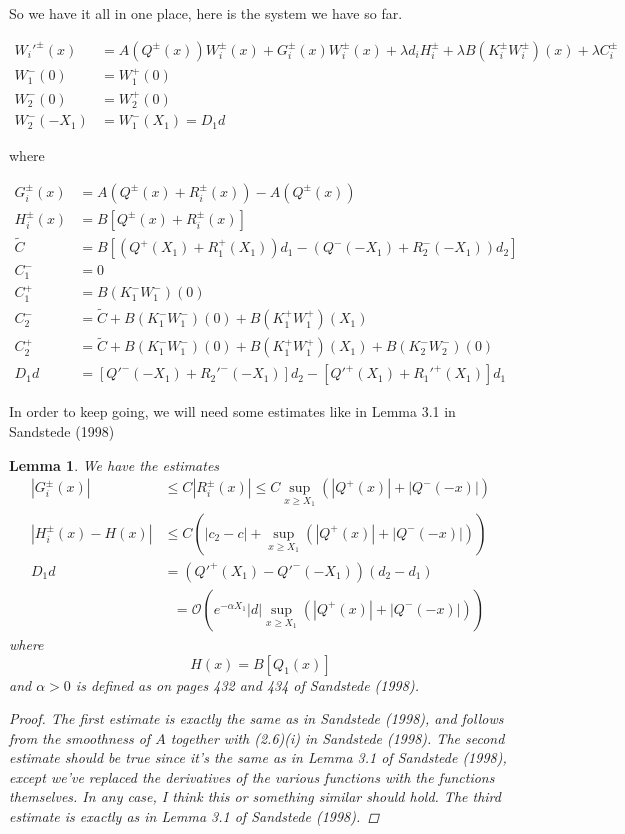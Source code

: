 \documentclass[12pt]{article}
\newtheorem{lemma}{Lemma}
\begin{document}
So we have it all in one place, here is the system we have so far.

\begin{align*}
W_i'^\pm(x) &= A(Q^\pm(x))W_i^\pm(x) + G_i^\pm(x)W_i^\pm(x) + \lambda d_i H_i^\pm + \lambda B (K_i^\pm W_i^\pm)(x) + \lambda C_i^\pm \\
W_1^-(0) &= W_1^+(0) \\
W_2^-(0) &= W_2^+(0) \\
W_2^-(-X_1) &= W_1^-(X_1) = D_1 d
\end{align*}

where

\begin{align*}
G_i^\pm(x) &= A(Q^\pm(x) + R_i^\pm(x)) - A(Q^\pm(x)) \\
H_i^\pm(x) &= B[Q^\pm(x) + R_i^\pm(x)] \\
\tilde{C} &= B[ (Q^+(X_1) + R_1^+(X_1)) d_1 - (Q^-(-X_1) + R_2^-(-X_1)) d_2 ] \\
C_1^- &= 0 \\
C_1^+ &= B(K_1^- W_1^-)(0) \\
C_2^- &= \tilde{C} + B(K_1^- W_1^-)(0) + B(K_1^+ W_1^+)(X_1) \\
C_2^+ &= \tilde{C} + B(K_1^- W_1^-)(0) + B(K_1^+ W_1^+)(X_1) + B(K_2^- W_2^-)(0) \\
D_1 d &= [Q'^-(-X_1) + R_2'^-(-X_1)]d_2 - [Q'^+(X_1) + R_1'^+(X_1)]d_1
\end{align*}

In order to keep going, we will need some estimates like in Lemma 3.1 in Sandstede (1998)

\begin{lemma}We have the estimates
\begin{align*}
|G_i^\pm(x)| &\leq C|R_i^\pm(x)| \leq C \sup_{x \geq X_1} \left( |Q^+(x)| + |Q^-(-x)| \right)\\
|H_i^\pm(x) - H(x)| &\leq C\left(|c_2 - c| + \sup_{x \geq X_1} \left( |Q^+(x)| + |Q^-(-x)| \right) \right)\\
D_1 d &= (Q'^+(X_1) - Q'^-(-X_1))(d_2 - d_1) \\
&\:\:\: =\mathcal{O}\left( e^{-\alpha X_1} |d| \sup_{x \geq X_1} \left( |Q^+(x)| + |Q^-(-x)| \right) \right)
\end{align*}
where
\[
H(x) = B[Q_1(x)]
\]
and $\alpha > 0$ is defined as on pages 432 and 434 of Sandstede (1998).
\begin{proof}
The first estimate is exactly the same as in Sandstede (1998), and follows from the smoothness of $A$ together with (2.6)(i) in Sandstede (1998). The second estimate should be true since it's the same as in Lemma 3.1 of Sandstede (1998), except we've replaced the derivatives of the various functions with the functions themselves. In any case, I think this or something similar should hold. The third estimate is exactly as in Lemma 3.1 of Sandstede (1998).
\end{proof}
\end{lemma}
\end{document}
